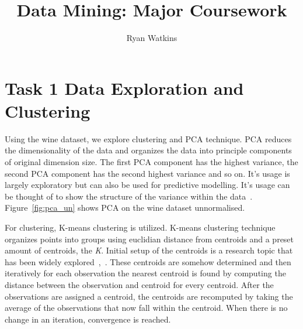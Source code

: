 \documentclass[11pt]{article}
\begin{document}
\author{Ryan Watkins}
\title{Data Mining: Major Coursework}
\maketitle
\pagebreak
\tableofcontents
\pagebreak

\section{Task 1 \- Data Exploration and Clustering}
Using the wine dataset, we explore clustering and PCA technique. PCA reduces the dimensionality of the data and organizes the data into principle components of original dimension size. The first PCA component has the highest variance, the second PCA component has the second highest variance and so on. It's usage is largely exploratory but can also be used for predictive modelling. It's usage can be thought of to show the structure of the variance within the data~\cite{dunteman1989principal}. Figure~\ref{fig:pca_un} shows PCA on the wine dataset unnormalised.

For clustering, K-means clustering is utilized. K-means clustering technique organizes points into groups using euclidian distance from centroids and a preset amount of centroids, the \textit{K}. Initial setup of the centroids is a research topic that has been widely explored~\cite{pelleg2000x},~\cite{arai2007hierarchical}. These centroids are somehow determined and then iteratively for each observation the nearest centroid is found by computing the distance between the observation and centroid for every centroid. After the observations are assigned a centroid, the centroids are recomputed by taking the average of the observations that now fall within the centroid. When there is no change in an iteration, convergence is reached. 
\end{document}
